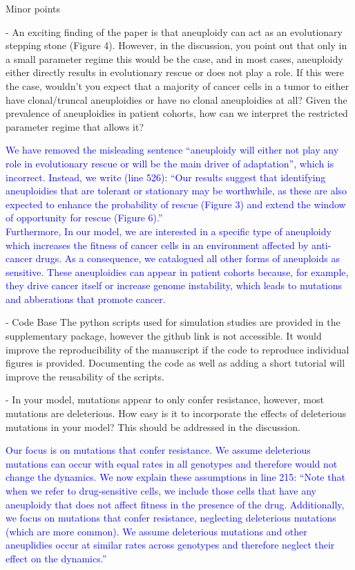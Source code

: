 \documentclass[12pt]{extarticle}
\begin{document}
Minor points

- An exciting finding of the paper is that aneuploidy can act as an evolutionary stepping stone (Figure 4). However, in the discussion, you point out that only in a small parameter regime this would be the case, and in most cases, aneuploidy either directly results in evolutionary rescue or does not play a role. If this were the case, wouldn't you expect that a majority of cancer cells in a tumor to either have clonal/truncal aneuploidies or have no clonal aneuploidies at all? Given the prevalence of aneuploidies in patient cohorts, how can we interpret the restricted parameter regime that allows it?

\textcolor{blue}{
We have removed the misleading sentence ``aneuploidy will either not play any role in evolutionary rescue or will be the main driver of adaptation'', which is incorrect. Instead, we write (line 526): ``Our results suggest that identifying aneuploidies that are tolerant or stationary may be worthwhile, as these are also expected to enhance the probability of rescue (Figure 3) and extend the window of opportunity for rescue (Figure 6).''\\
Furthermore, In our model, we are interested in a specific type of aneuploidy which increases the fitness of cancer cells in an environment affected by anti-cancer drugs. As a consequence, we catalogued all other forms of aneuploids as sensitive. These aneuploidies can appear in patient cohorts because, for example, they drive cancer itself or increase genome instability, which leads to mutations and abberations that promote cancer.
} 

- Code Base
The python scripts used for simulation studies are provided in the supplementary package, however the github link is not accessible.
It would improve the reproducibility of the manuscript if the code to reproduce individual figures is provided.
Documenting the code as well as adding a short tutorial will improve the reusability of the scripts.

- In your model, mutations appear to only confer resistance, however, most mutations are deleterious. How easy is it to incorporate the effects of deleterious mutations in your model? This should be addressed in the discussion.

\textcolor{blue}{Our focus is on mutations that confer resistance. We assume deleterious mutations can occur with equal rates in all genotypes and therefore would not change the dynamics. We now explain these assumptions in line 215: ``Note that when we refer to drug-sensitive cells, we include those cells that have any aneuploidy that does not affect fitness in the presence of the drug. Additionally, we focus on mutations that confer resistance, neglecting deleterious mutations (which are more common). We assume deleterious mutations and other aneuplidies occur at similar rates across genotypes and therefore neglect their effect on the dynamics.''
} 
\end{document}
